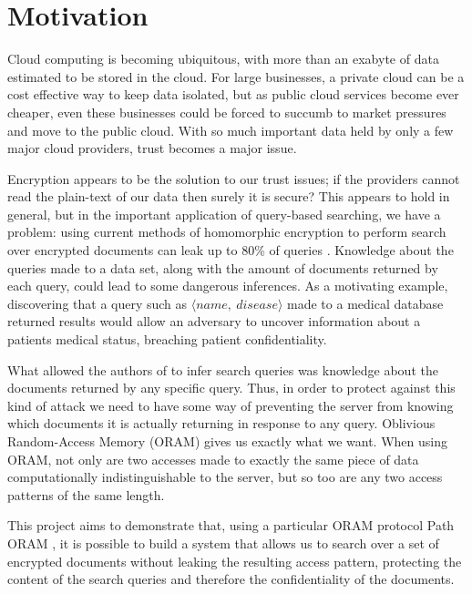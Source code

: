 \documentclass[12pt,a4paper,twoside,openright]{report}
\begin{document}


\section{Motivation}

Cloud computing is becoming ubiquitous, with more than an exabyte of data estimated to be stored in the cloud. For large businesses, a private cloud can be a cost effective way to keep data isolated, but as public cloud services become ever cheaper, even these businesses could be forced to succumb to market pressures and move to the public cloud. With so much important data held by only a few major cloud providers, trust becomes a major issue.

Encryption appears to be the solution to our trust issues; if the providers cannot read the plain-text of our data then surely it is secure? This appears to hold in general, but in the important application of query-based searching, we have a problem: using current methods of homomorphic encryption to perform search over encrypted documents can leak up to 80\% of queries \cite{islam2012access}. Knowledge about the queries made to a data set, along with the amount of documents returned by each query, could lead to some dangerous inferences. As a motivating example, discovering that a query such as $\langle name,~disease\rangle$ made to a medical database returned results would allow an adversary to uncover information about a patients medical status, breaching patient confidentiality.

What allowed the authors of \cite{islam2012access} to infer search queries was knowledge about the documents returned by any specific query. Thus, in order to protect against this kind of attack we need to have some way of preventing the server from knowing which documents it is actually returning in response to any query. Oblivious Random-Access Memory (ORAM) gives us exactly what we want. When using ORAM, not only are two accesses made to exactly the same piece of data computationally indistinguishable to the server, but so too are any two access patterns of the same length.

This project aims to demonstrate that, using a particular ORAM protocol Path ORAM \cite{stefanov2013path}, it is possible to build a system that allows us to search over a set of encrypted documents without leaking the resulting access pattern, protecting the content of the search queries and therefore the confidentiality of the documents.
\end{document}
